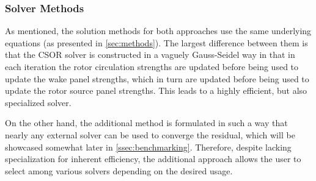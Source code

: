 \subsubsection{Solver Methods}

As mentioned, the solution methods for both approaches use the same underlying equations (as presented in \cref{sec:methods}).
%
The largest difference between them is that the CSOR solver is constructed in a vaguely Gauss-Seidel way in that in each iteration the rotor circulation strengths are updated before being used to update the wake panel strengths, which in turn are updated before being used to update the rotor source panel strengths.
%
This leads to a highly efficient, but also specialized solver.

On the other hand, the additional method is formulated in such a way that nearly any external solver can be used to converge the residual, which will be showcased somewhat later in \cref{ssec:benchmarking}.
%
Therefore, despite lacking specialization for inherent efficiency, the additional approach allows the user to select among various solvers depending on the desired usage.

